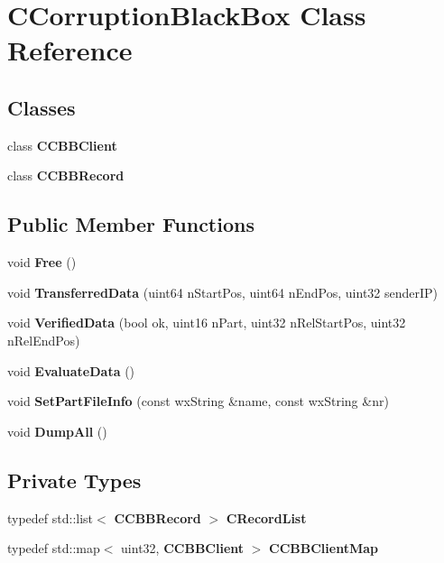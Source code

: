 \section{CCorruptionBlackBox Class Reference}
\label{classCCorruptionBlackBox}
\subsection*{Classes}
\begin{DoxyCompactItemize}
\item 
class {\bf CCBBClient}
\item 
class {\bf CCBBRecord}
\end{DoxyCompactItemize}
\subsection*{Public Member Functions}
\begin{DoxyCompactItemize}
\item 
void {\bfseries Free} ()\label{classCCorruptionBlackBox_a155b069b6ba7f616609b2df574285e6e}

\item 
void {\bfseries TransferredData} (uint64 nStartPos, uint64 nEndPos, uint32 senderIP)\label{classCCorruptionBlackBox_a2735e6071679eb6324e7edf6bcff7952}

\item 
void {\bfseries VerifiedData} (bool ok, uint16 nPart, uint32 nRelStartPos, uint32 nRelEndPos)\label{classCCorruptionBlackBox_a158c5aa3cbc4dea075d815a6aef64c82}

\item 
void {\bfseries EvaluateData} ()\label{classCCorruptionBlackBox_a29c2d15f35bd4e248140480758bb1f3b}

\item 
void {\bfseries SetPartFileInfo} (const wxString \&name, const wxString \&nr)\label{classCCorruptionBlackBox_acff63251f0fbdf9ccf2471cde5b73f01}

\item 
void {\bfseries DumpAll} ()\label{classCCorruptionBlackBox_a170b8adce62b50857971b2634a2b5e75}

\end{DoxyCompactItemize}
\subsection*{Private Types}
\begin{DoxyCompactItemize}
\item 
typedef std::list$<$ {\bf CCBBRecord} $>$ {\bfseries CRecordList}\label{classCCorruptionBlackBox_a64679e4162ef16a11928b3a96b6de86a}

\item 
typedef std::map$<$ uint32, {\bf CCBBClient} $>$ {\bfseries CCBBClientMap}\label{classCCorruptionBlackBox_a6a54a2050caf120644d58404c9b1f173}

\end{DoxyCompactItemize}
